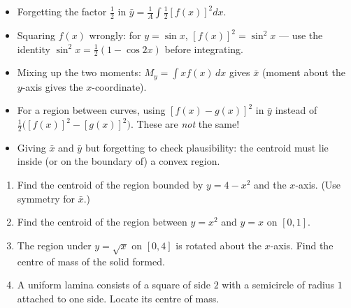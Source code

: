 \documentclass[11pt]{article}
\begin{document}
\begin{attention}
\begin{itemize}
\item Forgetting the factor $\tfrac12$ in $\bar{y}=\frac{1}{A}\int \tfrac12[f(x)]^2dx$.
\item Squaring $f(x)$ wrongly: for $y=\sin x$, $[f(x)]^2=\sin^2 x$ — use the identity $\sin^2x=\tfrac12(1-\cos2x)$ before integrating.
\item Mixing up the two moments: $M_y=\int x f(x)\,dx$ gives $\bar{x}$ (moment about the $y$-axis gives the $x$-coordinate).
\item For a region between curves, using $[f(x)-g(x)]^2$ in $\bar{y}$ instead of $\tfrac12\big([f(x)]^2-[g(x)]^2\big)$. These are \emph{not} the same!
\item Giving $\bar{x}$ and $\bar{y}$ but forgetting to check plausibility: the centroid must lie inside (or on the boundary of) a convex region.
\end{itemize}
\end{attention}

\begin{exercice}[Consolidation]
\begin{enumerate}
\item Find the centroid of the region bounded by $y=4-x^2$ and the $x$-axis. (Use symmetry for $\bar{x}$.)
\item Find the centroid of the region between $y=x^2$ and $y=x$ on $[0,1]$.
\item The region under $y=\sqrt{x}$ on $[0,4]$ is rotated about the $x$-axis. Find the centre of mass of the solid formed.
\item A uniform lamina consists of a square of side $2$ with a semicircle of radius $1$ attached to one side. Locate its centre of mass.
\end{enumerate}
\end{exercice}
\end{document}
